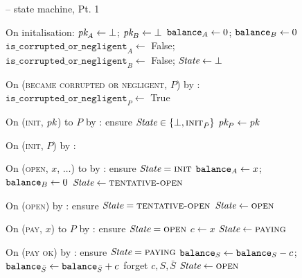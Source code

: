 \begin{figure}[H]
  \begin{systembox}{\fchan{} -- state machine, Pt. 1}
    \begin{algorithmic}[1]
      \State On initalisation:
      \Indent
        \State $\textit{pk}_{A} \gets \bot$; $\textit{pk}_{B} \gets \bot$
        \State $\texttt{balance}_{A} \gets 0$; $\texttt{balance}_{B} \gets 0$
        \State $\texttt{is\_corrupted\_or\_negligent}_A \gets$ False;
        $\texttt{is\_corrupted\_or\_negligent}_B \gets$ False;
        \State $\itistate \gets \bot$
      \EndIndent
      \Statex

      \State On (\textsc{became corrupted or negligent}, $P$) by \adversary:
      \Indent
        \State $\texttt{is\_corrupted\_or\_negligent}_P \gets$ True
      \EndIndent
      \Statex

      \State On (\textsc{init}, $\textit{pk}_{}$) to $P$ by \environment:
      \Indent
        \State ensure $\itistate \in \{\bot, \textsc{init}_{\bar{P}}\}$
        \State $\textit{pk}_{P} \gets \textit{pk}_{}$
      \EndIndent
      \Statex

      \State On (\textsc{init}, $P$) by \adversary:
      \Indent
      \EndIndent
      \Statex

      \State On (\textsc{open}, $x$, $\dots$) to \alice by \environment:
      \Indent
        \State ensure $\itistate = \textsc{init}$
        \State $\texttt{balance}_{A} \gets x$; $\texttt{balance}_{B} \gets 0$
        \State $\itistate \gets \textsc{tentative-open}$
      \EndIndent
      \Statex

      \State On (\textsc{open}) by \adversary:
      \Indent
        \State ensure $\itistate = \textsc{tentative-open}$
        \State $\itistate \gets \textsc{open}$
      \EndIndent
      \Statex

      \State On (\textsc{pay}, $x$) to $P$ by \environment:
      \Indent
        \State ensure $\itistate = \textsc{open}$
        \State $c \gets x$
        \State $\itistate \gets \textsc{paying}$
      \EndIndent
      \Statex

      \State On (\textsc{pay ok}) by \adversary:
      \Indent
        \State ensure $\itistate = \textsc{paying}$
        \State $\texttt{balance}_{S} \gets \texttt{balance}_{S} - c$; $\texttt{balance}_{\bar{S}} \gets
        \texttt{balance}_{\bar{S}} + c$
        \State forget $c, S, \bar{S}$
        \State $\itistate \gets \textsc{open}$
      \EndIndent
    \end{algorithmic}
  \end{systembox}
  \caption{}
  \label{code:functionality:state-machine-1}
\end{figure}

